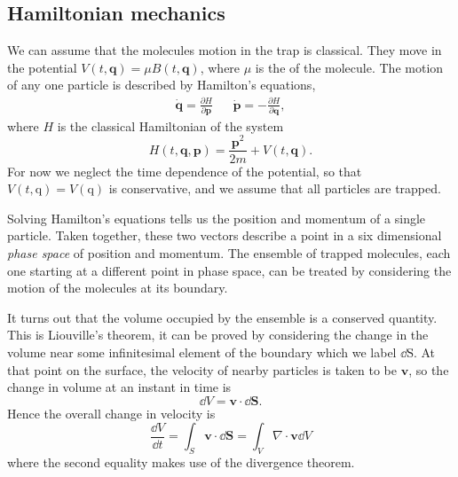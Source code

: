 \subsection{Hamiltonian mechanics}

We can assume that the molecules motion in the trap is classical. They move in
the potential $V(t, \mathbf{q}) = \mu B(t, \mathbf{q})$, where $\mu$ is the
 of the molecule.  The motion of any one particle is
described by Hamilton's equations,~\cite{Lichtenberg1969}
%
\begin{align}
  \label{design:eq:hamilton}
  \dot{\mathbf{q}} =  \frac{\partial H}{\partial \mathbf{p}} &&
  \dot{\mathbf{p}} = -\frac{\partial H}{\partial \mathbf{q}},
\end{align}
%
where $H$ is the classical Hamiltonian of the system
\begin{equation}
  H(t, \mathbf{q}, \mathbf{p}) = \frac{\mathbf{p}^2}{2m} + V(t, \mathbf{q}).
\end{equation}
For now we neglect the time dependence of the potential, so that $V(t,
\mathrm{q}) = V(\mathrm{q})$ is conservative, and we assume that all particles
are trapped.

Solving Hamilton's equations tells us the position and momentum of a single
particle. Taken together, these two vectors describe a point in a six
dimensional \emph{phase space} of position and momentum. The ensemble of
trapped molecules, each one starting at a different point in phase space, can
be treated by considering the motion of the molecules at its boundary.~\cite{}

It turns out that the volume occupied by the ensemble is a conserved quantity.
This is Liouville's theorem, it can be proved by considering the change in the
volume near some infinitesimal element of the boundary which we label $\dd
\mathrm{S}$. At that point on the surface, the velocity of nearby particles is
taken to be $\mathbf{v}$, so the change in volume at an instant in time is
%
\begin{equation}
  \dd V = \mathbf{v} \cdot \dd \mathbf{S}.
\end{equation}
%
Hence the overall change in velocity is
%
\begin{equation}
  \frac{\dd V}{\dd t} = \int_S \mathbf{v} \cdot \dd \mathbf{S} = \int_V \nabla 
  \cdot \mathbf{v} \dd V
\end{equation}
where the second equality makes use of the divergence theorem.

